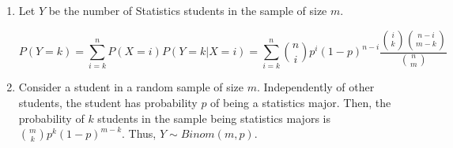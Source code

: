 \begin{enumerate}[label=(\alph*)]
\item Let $Y$ be the number of Statistics students in the sample of size $m$.

$$P(Y=k) = \sum_{i=k}^{n}P(X=i)P(Y=k|X=i) = \sum_{i=k}^{n}\binom{n}{i}p^{i}
(1-p)^{n-i}\frac{\binom{i}{k}\binom{n-i}{m-k}}{\binom{n}{m}}$$

\item Consider a student in a random sample of size $m$. Independently of
other students, the student has
probability $p$ of being a statistics major. Then, the probability of $k$
students in the sample being statistics majors is $\binom{m}{k}p^{k}(1-p)^
{m-k}$. Thus, $Y \sim Binom(m,p)$.
\end{enumerate}